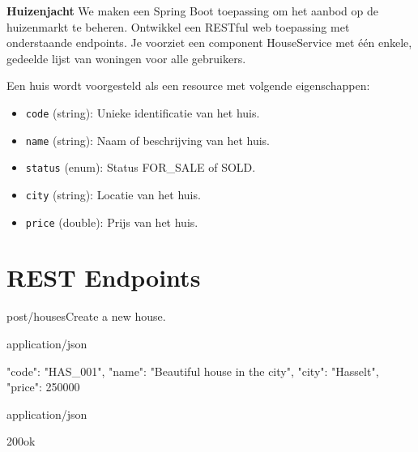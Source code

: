 \begin{oefening}\textbf{Huizenjacht}
We maken een Spring Boot toepassing om het aanbod op de huizenmarkt te beheren.
Ontwikkel een RESTful web toepassing met onderstaande endpoints.
Je voorziet een component HouseService met \'e\'en enkele, gedeelde lijst van woningen  voor alle gebruikers.

Een huis wordt voorgesteld als een resource met volgende eigenschappen:

\begin{itemize}
  \item \texttt{code} (string): Unieke identificatie van het huis.
  \item \texttt{name} (string): Naam of beschrijving van het huis.
  \item \texttt{status} (enum): Status FOR\_SALE of SOLD.
  \item \texttt{city} (string): Locatie van het huis.
  \item \texttt{price} (double): Prijs van het huis.
\end{itemize}

\section{REST Endpoints}

\begin{apiRoute}{post}{/houses}{Create a new house.}
\begin{routeParameter}
\end{routeParameter}
\begin{routeRequest}{application/json}
\begin{routeRequestBody}
{
  "code": "HAS_001",
  "name": "Beautiful house in the city",
  "city": "Hasselt",
  "price": 250000
}
\end{routeRequestBody}
\end{routeRequest}
\begin{routeResponse}{application/json}
\begin{routeResponseItem}{200}{ok}
\end{routeResponseItem}
\end{routeResponse}
\end{apiRoute}



\end{oefening}
